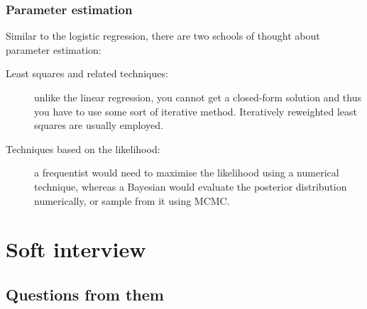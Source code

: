 \documentclass[a4paper]{article}
\begin{document}
\subsubsection{Parameter estimation}

Similar to the logistic regression, there are two schools of thought about parameter estimation:
\begin{description}
  \item[Least squares and related techniques:]
    unlike the linear regression, you cannot get a closed-form solution and thus you have to use some sort of iterative method. Iteratively reweighted least squares are usually employed.
  \item[Techniques based on the likelihood:]
  a frequentist would need to maximise the likelihood using a numerical technique, whereas a Bayesian would evaluate the posterior distribution numerically, or sample from it using MCMC.
\end{description}



\section{Soft interview}

\subsection{Questions from them}
\end{document}
